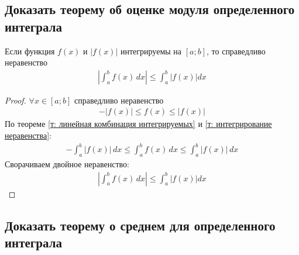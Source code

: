 \subsection{Доказать теорему об оценке модуля определенного интеграла}
\setcounter{theorem}{8}
\begin{theorem}
    Если функция $f(x)$ и $|f(x)|$ интегрируемы на $[a;b]$, то справедливо неравенство
    \begin{gather*}
        \boxed{\left| \int_{a}^{b} f(x)\, dx \right| \leqslant \int_{a}^{b} \big|f(x)\big| dx}
    \end{gather*}
\end{theorem}
\begin{proof}
    $\forall x \in [a;b]$ справедливо неравенство
    \begin{gather*}
        -\big|f(x)\big| \leqslant f(x) \leqslant \big|f(x)\big|
    \end{gather*}
    По теореме \ref{т: линейная комбинация интегрируемых} и \ref{т: интегрирование неравенства}:
    \begin{gather*}
        - \int_{a}^{b} \big|f(x)\big|\, dx \leqslant \int_{a}^{b} f(x)\, dx \leqslant \int_{a}^{b} \big|f(x)\big|\, dx
    \end{gather*}
    Сворачиваем двойное неравенство:
    \begin{gather*}
        \left| \int_{a}^{b} f(x)\, dx \right| \leqslant \int_{a}^{b} \big|f(x)\big| dx
    \end{gather*}
\end{proof}

\newpage
\subsection{Доказать теорему о среднем для определенного интеграла}

